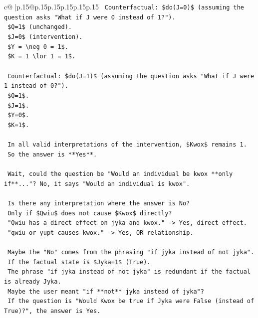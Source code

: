 \documentclass{article}
\begin{document}
{\begin{supertabular}{c@{$\;$}|p{.15\linewidth}@{}p{.15\linewidth}p{.15\linewidth}p{.15\linewidth}p{.15\linewidth}p{.15\linewidth}}
{{{\texttt{    Counterfactual: \$do(J=0)\$ (assuming the question asks "What if J were 0 instead of 1?").} \\
\texttt{    \$Q=1\$ (unchanged).} \\
\texttt{    \$J=0\$ (intervention).} \\
\texttt{    \$Y = \textbackslash{}neg 0 = 1\$.} \\
\texttt{    \$K = 1 \textbackslash{}lor 1 = 1\$.} \\
\\ 
\texttt{    Counterfactual: \$do(J=1)\$ (assuming the question asks "What if J were 1 instead of 0?").} \\
\texttt{    \$Q=1\$.} \\
\texttt{    \$J=1\$.} \\
\texttt{    \$Y=0\$.} \\
\texttt{    \$K=1\$.} \\
\\ 
\texttt{    In all valid interpretations of the intervention, \$Kwox\$ remains 1.} \\
\texttt{    So the answer is **Yes**.} \\
\\ 
\texttt{    Wait, could the question be "Would an individual be kwox **only if**..."? No, it says "Would an individual is kwox".} \\
\\ 
\texttt{    Is there any interpretation where the answer is No?} \\
\texttt{    Only if \$Qwiu\$ does not cause \$Kwox\$ directly?} \\
\texttt{    "Qwiu has a direct effect on jyka and kwox." {-}> Yes, direct effect.} \\
\texttt{    "qwiu or yupt causes kwox." {-}> Yes, OR relationship.} \\
\\ 
\texttt{    Maybe the "No" comes from the phrasing "if jyka instead of not jyka".} \\
\texttt{    If the factual state is \$Jyka=1\$ (True).} \\
\texttt{    The phrase "if jyka instead of not jyka" is redundant if the factual is already Jyka.} \\
\texttt{    Maybe the user meant "if **not** jyka instead of jyka"?} \\
\texttt{    If the question is "Would Kwox be true if Jyka were False (instead of True)?", the answer is Yes.} \\
\\ 
}}}
\end{supertabular}}
\end{document}
